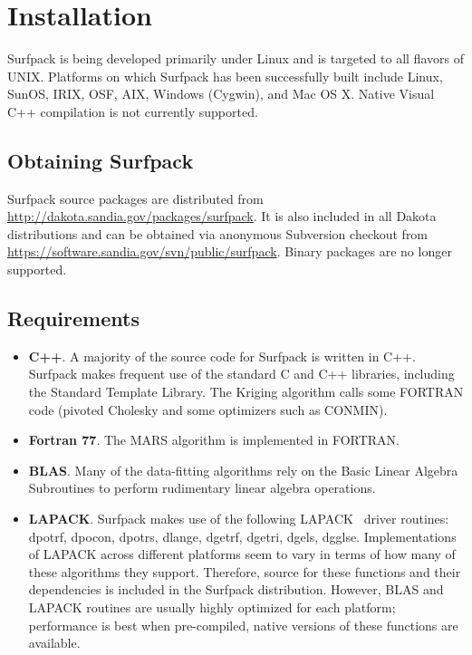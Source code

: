 \documentclass{article}
\begin{document}
\section{Installation}\label{sec:installation}
Surfpack is being developed primarily under Linux and is targeted to
all flavors of UNIX.  Platforms on which Surfpack has been
successfully built include Linux, SunOS, IRIX, OSF, AIX, Windows
(Cygwin), and Mac OS X.  Native Visual C++ compilation is not
currently supported.

\subsection{Obtaining Surfpack}
Surfpack source packages are distributed from
\url{http://dakota.sandia.gov/packages/surfpack}.  It is also included
in all Dakota distributions and can be obtained via anonymous
Subversion checkout from
\url{https://software.sandia.gov/svn/public/surfpack}.  Binary
packages are no longer supported.

\subsection{Requirements}
\begin{itemize}
\item {\bf C++}.  A majority of the source code for Surfpack is written in C++.  Surfpack makes frequent use of the standard C and C++ libraries, including the Standard Template Library.  The Kriging algorithm calls some FORTRAN code (pivoted Cholesky and some optimizers such as CONMIN).  
\item {\bf Fortran 77}.  The MARS algorithm is implemented in FORTRAN.  
\item {\bf BLAS}.  Many of the data-fitting algorithms rely on the Basic Linear Algebra Subroutines to perform rudimentary linear algebra operations.
\item {\bf LAPACK}.  Surfpack makes use of the following LAPACK~\cite{anderson}  driver routines: dpotrf, dpocon, dpotrs, dlange, dgetrf, dgetri, dgels, dgglse.  Implementations of LAPACK across different platforms seem to vary in terms of how many of these algorithms they support.  Therefore, source for these functions and their dependencies is included in the Surfpack distribution.  However, BLAS and LAPACK routines are usually highly optimized for each platform; performance is best when pre-compiled, native versions of these functions are available.
\end{itemize}
\end{document}
